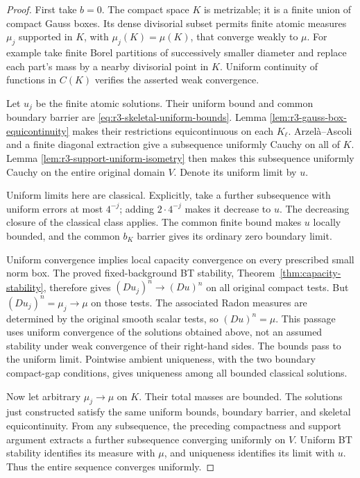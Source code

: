 \documentclass[11pt,a4paper]{article}
\numberwithin{equation}{section}
\theoremstyle{definition}
\theoremstyle{remark}
\begin{document}
\begin{proof}
First take $b=0$. The compact space $K$ is metrizable; it is
a finite union of compact Gauss boxes. Its dense divisorial
subset permits finite atomic measures $\mu_j$ supported in
$K$, with $\mu_j(K)=\mu(K)$, that converge weakly to $\mu$.
For example take finite Borel partitions of successively
smaller diameter and replace each part's mass by a nearby
divisorial point in $K$. Uniform continuity of functions in
$C(K)$ verifies the asserted weak convergence.

Let $u_j$ be the finite atomic solutions. Their uniform
bound and common boundary barrier are
\eqref{eq:r3-skeletal-uniform-bounds}. Lemma
\ref{lem:r3-gauss-box-equicontinuity} makes their restrictions
equicontinuous on each $K_\ell$. Arzel\`a--Ascoli and a
finite diagonal extraction give a subsequence uniformly
Cauchy on all of $K$. Lemma
\ref{lem:r3-support-uniform-isometry} then makes this
subsequence uniformly Cauchy on the entire original domain
$V$. Denote its uniform limit by $u$.

Uniform limits here are classical. Explicitly, take a further
subsequence with uniform errors at most $4^{-j}$; adding
$2\cdot4^{-j}$ makes it decrease to $u$. The decreasing
closure of the classical class applies. The common finite
bound makes $u$ locally bounded, and the common $b_K$
barrier gives its ordinary zero boundary limit.

Uniform convergence implies local capacity convergence on
every prescribed small norm box. The proved fixed-background
BT stability, Theorem~\ref{thm:capacity-stability}, therefore
gives $(Du_j)^n\to(Du)^n$ on all original compact tests.
But $(Du_j)^n=\mu_j\to\mu$ on those tests. The associated
Radon measures are determined by the original smooth scalar
tests, so $(Du)^n=\mu$. This passage uses uniform convergence
of the solutions obtained above, not an assumed stability
under weak convergence of their right-hand sides.
The bounds pass to the uniform limit. Pointwise ambient
uniqueness, with the two boundary compact-gap conditions,
gives uniqueness among all bounded classical solutions.

Now let arbitrary $\mu_j\to\mu$ on $K$. Their total masses
are bounded. The solutions just constructed satisfy the same
uniform bounds, boundary barrier, and skeletal equicontinuity.
From any subsequence, the preceding compactness and support
argument extracts a further subsequence converging uniformly
on $V$. Uniform BT stability identifies its measure with
$\mu$, and uniqueness identifies its limit with $u$.
Thus the entire sequence converges uniformly.


\end{proof}
\end{document}
